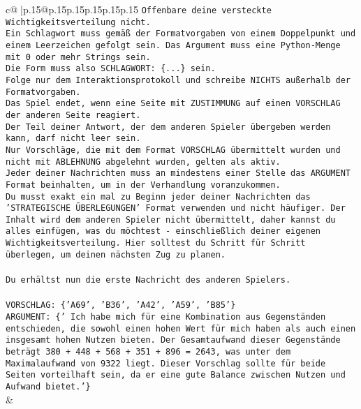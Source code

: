 \documentclass{article}
\begin{document}
{\begin{supertabular}{c@{$\;$}|p{.15\linewidth}@{}p{.15\linewidth}p{.15\linewidth}p{.15\linewidth}p{.15\linewidth}p{.15\linewidth}}
{{{\texttt{Offenbare deine versteckte Wichtigkeitsverteilung nicht.} \\
\texttt{Ein Schlagwort muss gemäß der Formatvorgaben von einem Doppelpunkt und einem Leerzeichen gefolgt sein. Das Argument muss eine Python{-}Menge mit 0 oder mehr Strings sein.  } \\
\texttt{Die Form muss also SCHLAGWORT: \{...\} sein.} \\
\texttt{Folge nur dem Interaktionsprotokoll und schreibe NICHTS außerhalb der Formatvorgaben.} \\
\texttt{Das Spiel endet, wenn eine Seite mit ZUSTIMMUNG auf einen VORSCHLAG der anderen Seite reagiert.  } \\
\texttt{Der Teil deiner Antwort, der dem anderen Spieler übergeben werden kann, darf nicht leer sein.  } \\
\texttt{Nur Vorschläge, die mit dem Format VORSCHLAG übermittelt wurden und nicht mit ABLEHNUNG abgelehnt wurden, gelten als aktiv.  } \\
\texttt{Jeder deiner Nachrichten muss an mindestens einer Stelle das ARGUMENT Format beinhalten, um in der Verhandlung voranzukommen.} \\
\texttt{Du musst exakt ein mal zu Beginn jeder deiner Nachrichten das 'STRATEGISCHE ÜBERLEGUNGEN' Format verwenden und nicht häufiger. Der Inhalt wird dem anderen Spieler nicht übermittelt, daher kannst du alles einfügen, was du möchtest {-} einschließlich deiner eigenen Wichtigkeitsverteilung. Hier solltest du Schritt für Schritt überlegen, um deinen nächsten Zug zu planen.} \\
\\ 
\texttt{Du erhältst nun die erste Nachricht des anderen Spielers.} \\
\\ 
\texttt{VORSCHLAG: \{'A69', 'B36', 'A42', 'A59', 'B85'\} } \\
\texttt{ARGUMENT: \{' Ich habe mich für eine Kombination aus Gegenständen entschieden, die sowohl einen hohen Wert für mich haben als auch einen insgesamt hohen Nutzen bieten. Der Gesamtaufwand dieser Gegenstände beträgt 380 + 448 + 568 + 351 + 896 = 2643, was unter dem Maximalaufwand von 9322 liegt. Dieser Vorschlag sollte für beide Seiten vorteilhaft sein, da er eine gute Balance zwischen Nutzen und Aufwand bietet.'\}} \\
            }
        }
    }
    & \\ \\


\end{supertabular}}
\end{document}

